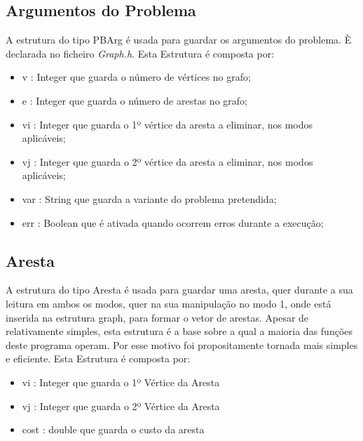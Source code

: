 \documentclass[14pt]{article}
\begin{document}
    \subsection[PBArg]{Argumentos do Problema}\label{subsec:argumentos.problema} 
    A estrutura do tipo PBArg é usada para guardar os argumentos do problema. È declarada no ficheiro \emph{Graph.h}.
    Esta Estrutura é composta por:
    \begin{itemize}
        \item v : Integer que guarda o número de vértices no grafo;
        \item e : Integer que guarda o número de arestas no grafo;
        \item vi : Integer que guarda o 1º vértice da aresta a eliminar, nos modos aplicáveis;
        \item vj : Integer que guarda o 2º vértice da aresta a eliminar, nos modos aplicáveis;
        \item var : String que guarda a variante do problema pretendida;
        \item err : Boolean que é ativada quando ocorrem erros durante a execução;
    \end{itemize}

    \subsection[edge]{Aresta}\label{subsec:aresta} 
    A estrutura do tipo Aresta é usada para guardar uma aresta, quer durante a sua leitura em ambos os modos, quer na
    sua manipulação no modo 1, onde está inserida na estrutura graph, para formar o vetor de arestas. Apesar de
    relativamente simples, esta estrutura é a base sobre a qual a maioria das funções deste programa operam. Por esse
    motivo foi propositamente tornada mais simples e eficiente.
    Esta Estrutura é composta por:
    \begin{itemize}
        \item vi : Integer que guarda o 1º Vértice da Aresta
        \item vj : Integer que guarda o 2º Vértice da Aresta
        \item cost : double que guarda o custo da aresta
    \end{itemize}
\end{document}

